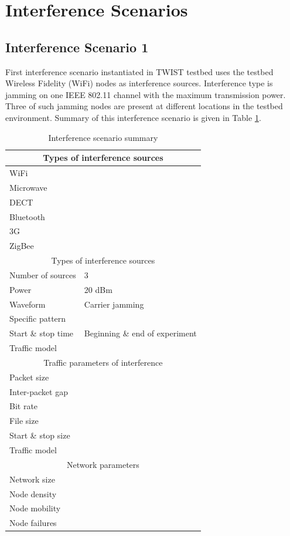 \documentclass[11pt,a4paper,headinclude,footinclude,chapterprefix=on]{scrreprt}
\begin{document}
\section{Interference Scenarios}\label{sec:interference} 
\subsection{Interference Scenario 1} First interference scenario instantiated in TWIST testbed uses the testbed Wireless Fidelity (WiFi) nodes as interference sources. Interference type is jamming on one IEEE 802.11 channel with the maximum transmission power. Three of such jamming nodes are present at different locations in the testbed environment. Summary of this interference scenario is given in Table \ref{tb:interf:1}. 
\begin{table}
	[h] \centering \caption{Interference scenario summary} \label{tb:interf:1} 
	\begin{tabular}
		{|l|l|} \hline \multicolumn{2}{|c|}{Types of interference sources} \\
		\hline WiFi & \checkmark \\
		Microwave & \texttimes \\
		DECT & \texttimes \\
		Bluetooth & \texttimes \\
		3G & \texttimes \\
		ZigBee & \texttimes \\
		\hline \multicolumn{2}{|c|}{Types of interference sources} \\
		\hline Number of sources & 3 \\
		Power & 20 dBm \\
		Waveform & Carrier jamming \\
		Specific pattern & \\
		Start \& stop time & Beginning \& end of experiment \\
		Traffic model & \\
		\hline \multicolumn{2}{|c|}{Traffic parameters of interference} \\
		\hline Packet size & \\
		Inter-packet gap & \\
		Bit rate & \\
		File size & \\
		Start \& stop size & \\
		Traffic model & \\
		\hline \multicolumn{2}{|c|}{Network parameters} \\
		\hline Network size & \\
		Node density & \\
		Node mobility & \\
		Node failures & \\
		\hline 
	\end{tabular}
\end{table}
\end{document}
